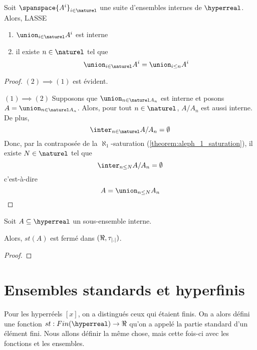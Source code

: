\documentclass[a4paper, 12pt]{report}
\begin{document}
\begin{corollary}
	Soit $\spanspace{A^{i}}_{i \in \naturel}$ une suite d'ensembles internes de
	$\hyperreal$.
	Alors, LASSE
	\begin{enumerate}
		\item $\union_{i \in \naturel} A^{i}$ est interne
		\item il existe $n \in \naturel$ tel que
			\begin{equation}
				\union_{i \in \naturel} A^{i} = \union_{i \leq n} A^{i}
			\end{equation}
	\end{enumerate}
\end{corollary}

\ifdefined\outputproof
\begin{proof}
	$(2) \implies (1)$ est évident.

	$(1) \implies (2)$ Supposons que $\union_{n \in \naturel A_{n}}$ est
	interne et posons $A = \union_{n \in \naturel A_{n}}$. Alors, pour tout $n
	\in \naturel$, $A/A_{n}$ est aussi interne.
	De plus,
	\begin{equation}
		\inter_{n \in \naturel} A/A_{n} = \emptyset
	\end{equation}
	Donc, par la contraposée de la $\aleph_{1}$-saturation
	(\ref{theorem:aleph_1_saturation}), il existe $N \in \naturel$ tel que
	\begin{equation}
		\inter_{n \leq N} A/A_{n} = \emptyset
	\end{equation}
	c'est-à-dire
	\begin{equation}
		A = \union_{n \leq N} A_{n}
	\end{equation}
\end{proof}
\fi

\begin{proposition}
	Soit $A \subseteq \hyperreal$ un sous-ensemble interne.

	Alors, $st(A)$ est fermé dans $(\real, \tau_{\abs{.}})$.
\end{proposition}

\ifdefined\outputproof
\begin{proof}

\end{proof}
\fi

\section{Ensembles standards et hyperfinis}

Pour les hyperréels $[x]$, on a distingués ceux qui étaient finis. On a alors
défini une fonction $st : Fin(\hyperreal) \rightarrow \real$ qu'on a appelé la
partie standard d'un élément fini.
Nous allons définir la même chose, mais cette fois-ci avec les fonctions et les
ensembles.
\end{document}
